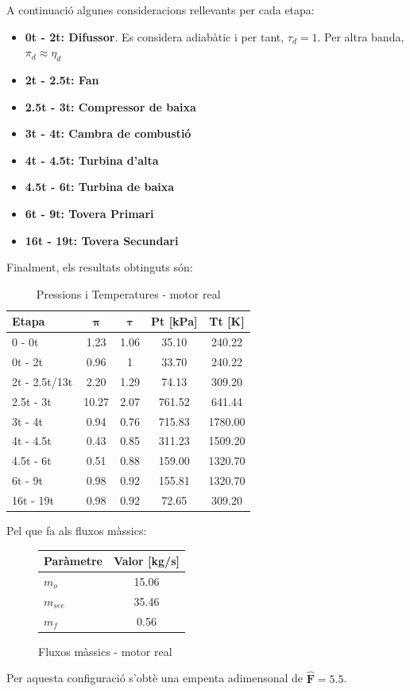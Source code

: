 A continuació algunes consideracions rellevants per cada etapa:
\begin{itemize}
\item \textbf{0t - 2t: Difussor}. Es considera adiabàtic i per tant, $\tau_d = 1$. Per altra banda, $\pi_d \approx \eta_d$
\item \textbf{2t - 2.5t: Fan}
\item \textbf{2.5t - 3t: Compressor de baixa}
\item \textbf{3t - 4t: Cambra de combustió}
\item \textbf{4t - 4.5t: Turbina d'alta}
\item \textbf{4.5t - 6t: Turbina de baixa}
\item \textbf{6t - 9t: Tovera Primari}
\item \textbf{16t - 19t: Tovera Secundari}
\end{itemize}
Finalment, els resultats obtinguts són:
\begin{table}[H]
\centering
\begin{tabular}{lcccc}
\toprule[3pt]
\textbf{Etapa} &\textbf{$\bm{\pi}$} & \textbf{$\bm{\tau}$}    & \textbf{Pt} [kPa]  & \textbf{Tt} [K]  \\
\midrule[1pt]
0 - 0t     & 1.23   & 1.06  & 35.10   & 240.22             \\
0t - 2t     & 0.96   & 1  & 33.70   & 240.22             \\
2t - 2.5t/13t     & 2.20   & 1.29  & 74.13   & 309.20             \\
2.5t - 3t     & 10.27  & 2.07  & 761.52   & 641.44             \\
3t - 4t     & 0.94     & 0.76  & 715.83  & 1780.00             \\
4t - 4.5t     & 0.43   & 0.85  & 311.23   & 1509.20             \\
4.5t - 6t     & 0.51   & 0.88  & 159.00   & 1320.70             \\
6t - 9t     & 0.98   & 0.92  & 155.81   & 1320.70            \\
16t - 19t     & 0.98   & 0.92  & 72.65   & 309.20            \\
\bottomrule[2pt]
\end{tabular}
\caption{Pressions i Temperatures - motor real}
\end{table}
Pel que fa als fluxos màssics:
\begin{figure}[H]
	\centering
	\begin{tabular}{lc}
		\toprule[3pt]
		\textbf{Paràmetre}&\textbf{Valor [kg/s]}\\
		\midrule[1pt]
		$m_{o}$ & 15.06 \\
		$m_{sec}$ & 35.46 \\
		$m_{f}$ & 0.56 \\
		\bottomrule[2pt]
	\end{tabular}
	\label{C_opti2}
	\caption{Fluxos màssics - motor real}
\end{figure}
Per aquesta configuració s'obtè una empenta adimensonal de $\bm{\hat{F} = 5.5}$.